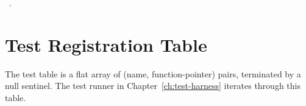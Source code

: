 \documentclass[11pt,a4paper,twoside,openright,DIV=15]{scrbook}
\theoremstyle{definition}
\theoremstyle{plain}
\theoremstyle{remark}
\begin{document}
\begin{flushleft}
\begin{minipage}{\linewidth}
\vspace{-1.5ex}
\footnotesize
\begin{list}{}{\setlength{\itemsep}{-\parsep}\setlength{\itemindent}{-\leftmargin}}
\item \NWtxtMacroRefIn\ .

\item{}
\end{list}
\end{minipage}\vspace{4ex}
\end{flushleft}
\section{Test Registration Table}

The test table is a flat array of (name, function-pointer) pairs,
terminated by a null sentinel.  The test runner in
Chapter~\ref{ch:test-harness} iterates through this table.
\end{document}
